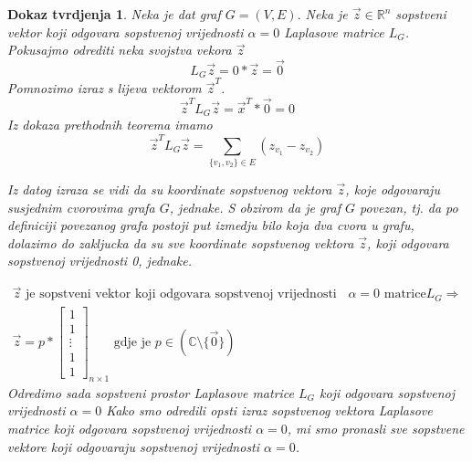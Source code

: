 \documentclass[11pt]{article}
\newtheorem*{custom_proof}{Dokaz tvrdjenja}
\begin{document}
	\begin{custom_proof}
	Neka je dat graf $G=(V,E).$ Neka je $\vec{z} \in \mathbb{R}^n$ sopstveni vektor koji odgovara sopstvenoj vrijednosti $\alpha = 0$ Laplasove matrice $L_G$.
	Pokusajmo odrediti neka svojstva vekora $\vec{z}$
	\[
		L_G\vec{z} = 0 * \vec{z} = \vec{0}
	\]
	Pomnozimo izraz s lijeva vektorom $\vec{z}^T$.
	\[
		\vec{z}^TL_G\vec{z} = \vec{x}^T * \vec{0} = 0
	\]
	Iz dokaza prethodnih teorema imamo 
	\[
	\vec{z}^TL_G\vec{z} = \sum_{\{v_1,v_2\} \in E} (z_{v_1} - z_{v_2})
	\]
	
	Iz datog izraza se vidi da su koordinate sopstvenog vektora $\vec{z}$, koje odgovaraju susjednim cvorovima grafa $G$, jednake. S obzirom da je graf $G$ povezan, tj. da po definiciji povezanog grafa postoji put izmedju bilo koja dva cvora u grafu, dolazimo do zakljucka da su sve koordinate sopstvenog vektora $\vec{z}$, koji odgovara sopstvenoj vrijednosti 0, jednake. 
	
	\[
	\begin{split}
	 \vec{z} \text{  je sopstveni vektor koji odgovara sopstvenoj vrijednosti } & \alpha = 0 \text{ matrice}  L_G \Rightarrow \\
	 \vec{z} =p *
	\begin{bmatrix} 
	1 \\ 1 \\ \vdots \\ 1 \\ 1
	\end{bmatrix}_{n \times 1}
	\text{ gdje je } p \in (\mathbb{C} \setminus \{\vec{0}\})
	\end{split}
	\]
	Odredimo sada sopstveni prostor Laplasove matrice $L_G$ koji odgovara sopstvenoj vrijednosti $\alpha = 0$
	Kako smo odredili opsti izraz sopstvenog vektora Laplasove matrice koji odgovara sopstvenoj vrijednosti $\alpha = 0$, mi smo pronasli sve sopstvene vektore koji odgovaraju sopstvenoj vrijednosti $\alpha = 0$.
	

\end{custom_proof}
\end{document}
